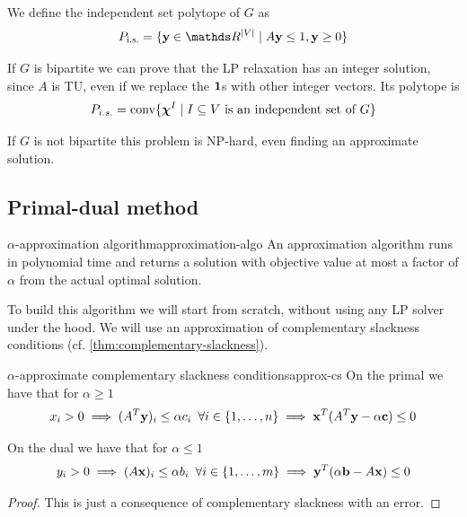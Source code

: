 \documentclass[12pt]{extarticle}
\renewcommand{\vec}[1]{\bvec{#1}}
\begin{document}
We define the independent set polytope of $G$ as
\begin{equation}
	P_\text{i.s.} = \{ \vec y \in \R^\abs{V} \mid A \vec y \leq 1, \vec y \geq 0\}
\end{equation}

If $G$ is bipartite we can prove that the LP relaxation has an integer solution, since $A$ is TU,
even if we replace the $\vec 1$s with other integer vectors. Its polytope is
\begin{equation}
	P_{i.s.} = \mathrm{conv}\{ \vec \chi^I \mid I \subseteq V \text{ is an independent set of } G\}
\end{equation}

If $G$ is not bipartite this problem is NP-hard, even finding an approximate solution.

\subsection{Primal-dual method}

\begin{definition}{$\alpha$-approximation algorithm}{approximation-algo}
	An approximation algorithm runs in polynomial time and returns a solution with objective value at
	most a factor of $\alpha$ from the actual optimal solution.
\end{definition}

To build this algorithm we will start from scratch, without using any LP solver under the hood.
We will use an approximation of complementary slackness conditions
(cf. \cref{thm:complementary-slackness}).

\begin{proposition}{$\alpha$-approximate complementary slackness conditions}{approx-cs}
	On the primal we have that for $\alpha \geq 1$
	\begin{equation}
		x_i > 0 \implies (A^T \vec y)_i \leq \alpha c_i \enspace \forall i \in \{1, \dots, n\}
		\implies \vec x^T(A^T \vec y - \alpha \vec c) \leq 0
	\end{equation}


	On the dual we have that for $\alpha \leq 1$
	\begin{equation}
		y_i > 0 \implies (A \vec x)_i \leq \alpha b_i \enspace \forall i \in \{1, \dots, m\}
		\implies \vec y^T(\alpha \vec b - A \vec x) \leq 0
	\end{equation}
\end{proposition}

\begin{proof}
	This is just a consequence of complementary slackness with an error.
\end{proof}
\end{document}
